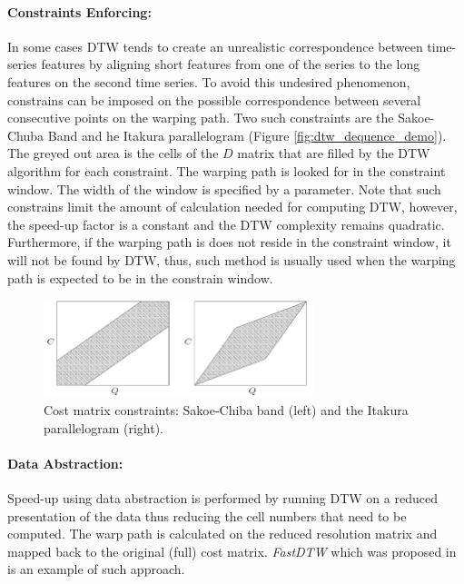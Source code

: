 \paragraph{Constraints Enforcing:} 
In some cases DTW tends to create an unrealistic correspondence between time-series features by aligning short features from one of the series to the long features on the second time series. 
To avoid this undesired phenomenon, constrains can be imposed on the possible correspondence between several consecutive points on the warping path. 
Two such constraints are the Sakoe-Chuba Band \cite{sakoe1978dynamic} and he Itakura parallelogram \cite{itakura1975minimum} (Figure \ref{fig:dtw_dequence_demo}). 
The greyed out area is the cells of the $D$ matrix that are filled by the DTW algorithm for each constraint. 
The warping path is looked for in the constraint window. 
The width of the window is specified by a parameter. 
Note that such constrains limit the amount of calculation needed for computing DTW, however, the speed-up factor is a constant and the DTW complexity remains quadratic. 
Furthermore, if the warping path is does not reside in the constraint window, it will not be found by DTW, thus, such method is usually used when the warping path is expected to be in the constrain window.

\begin{figure}
\centering
\includegraphics[width=0.7\textwidth]{./figures/dtw_sukoe_chuba}       
\caption{Cost matrix constraints: Sakoe-Chiba band (left) and the Itakura parallelogram (right).}
\label{fig:dtw_sukoe_chuba}
\end{figure}

\paragraph{Data Abstraction:} Speed-up using data abstraction is performed by running DTW on a reduced presentation of the data thus reducing the cell numbers that need to be computed. 
The warp path is calculated on the reduced resolution matrix and mapped back to the original (full) cost matrix. 
\emph{FastDTW} which was proposed in \cite{salvador2007toward} is an example of such approach. 
 
